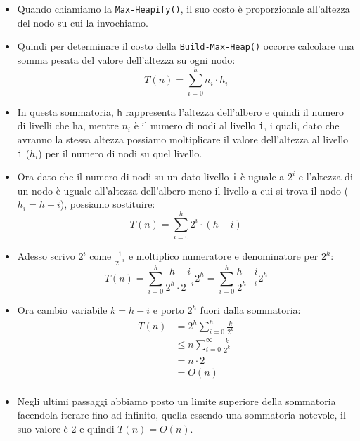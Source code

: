 \documentclass{article}
\begin{document}
\begin{itemize}
    \item Quando chiamiamo la \verb|Max-Heapify()|, il suo costo è proporzionale all'altezza del nodo su cui la invochiamo.
    \item Quindi per determinare il costo della \verb|Build-Max-Heap()| occorre calcolare una somma pesata del valore dell'altezza su ogni nodo:
    \begin{equation*}
        T(n) = \sum_{i = 0}^h n_i \cdot h_i
    \end{equation*}
    \item In questa sommatoria, \verb|h| rappresenta l'altezza dell'albero e quindi il numero di livelli che ha, mentre $n_i$ è il numero di nodi al livello \verb|i|, i quali, dato che avranno la stessa altezza possiamo moltiplicare il valore dell'altezza al livello \verb|i| ($h_i$) per il numero di nodi su quel livello.
    \item Ora dato che il numero di nodi su un dato livello \verb|i| è uguale a $2^i$ e l'altezza di un nodo è uguale all'altezza dell'albero meno il livello a cui si trova il nodo ($h_i = h - i$), possiamo sostituire:
    \begin{equation*}
        T(n) = \sum_{i = 0}^h 2^i \cdot (h - i)
    \end{equation*}
    \item Adesso scrivo $2^i$ come $\frac{1}{2^{-i}}$ e moltiplico numeratore e denominatore per $2^h$:
    \begin{equation*}
        T(n) = \sum_{i = 0}^h \frac{h - i}{2^h \cdot 2^{-i}} 2^h = \sum_{i = 0}^h \frac{h - i}{2^{h - i}}2^h
    \end{equation*}
    \item Ora cambio variabile $k = h - i$ e porto $2^h$ fuori dalla sommatoria:
    \begin{equation*}
        \begin{split}
            T(n) & = 2^h \sum_{i = 0}^h \frac{k}{2^k} \\
            & \leq n \sum_{i = 0}^{\infty} \frac{k}{2^k} \\
            & = n \cdot 2 \\
            & = O(n) \\
        \end{split}       
    \end{equation*}
    \item Negli ultimi passaggi abbiamo posto un limite superiore della sommatoria facendola iterare fino ad infinito, quella essendo una sommatoria notevole, il suo valore è $2$ e quindi $T(n) = O(n)$.
\end{itemize}
\end{document}
